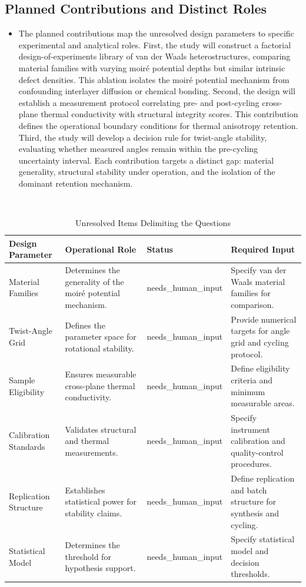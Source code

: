 \documentclass[conference]{IEEEtran}
\begin{document}
\subsection{Planned Contributions and Distinct Roles}
\begin{itemize}
\item The planned contributions map the unresolved design parameters to specific experimental and analytical roles. First, the study will construct a factorial design-of-experiments library of van der Waals heterostructures, comparing material families with varying moiré potential depths but similar intrinsic defect densities. This ablation isolates the moiré potential mechanism from confounding interlayer diffusion or chemical bonding. Second, the design will establish a measurement protocol correlating pre- and post-cycling cross-plane thermal conductivity with structural integrity scores. This contribution defines the operational boundary conditions for thermal anisotropy retention. Third, the study will develop a decision rule for twist-angle stability, evaluating whether measured angles remain within the pre-cycling uncertainty interval. Each contribution targets a distinct gap: material generality, structural stability under operation, and the isolation of the dominant retention mechanism.
\end{itemize}~\cite{cite_26ecaf73d88dfe33}

\begin{table}[htbp]
\centering
\footnotesize
\setlength{\tabcolsep}{3pt}
\renewcommand{\arraystretch}{1.12}
\caption{Unresolved Items Delimiting the Questions}
\label{tab:research-questions-and-contributions-block-003}
\begin{tabular}{|p{}|p{}|p{}|p{}|}
\hline
Design Parameter & Operational Role & Status & Required Input \\\hline
Material Families & Determines the generality of the moiré potential mechanism. & needs\_human\_input & Specify van der Waals material families for comparison. \\\hline
Twist-Angle Grid & Defines the parameter space for rotational stability. & needs\_human\_input & Provide numerical targets for angle grid and cycling protocol. \\\hline
Sample Eligibility & Ensures measurable cross-plane thermal conductivity. & needs\_human\_input & Define eligibility criteria and minimum measurable areas. \\\hline
Calibration Standards & Validates structural and thermal measurements. & needs\_human\_input & Specify instrument calibration and quality-control procedures. \\\hline
Replication Structure & Establishes statistical power for stability claims. & needs\_human\_input & Define replication and batch structure for synthesis and cycling. \\\hline
Statistical Model & Determines the threshold for hypothesis support. & needs\_human\_input & Specify statistical model and decision thresholds. \\\hline
\end{tabular}
\end{table}~\cite{cite_26ecaf73d88dfe33}
\end{document}
